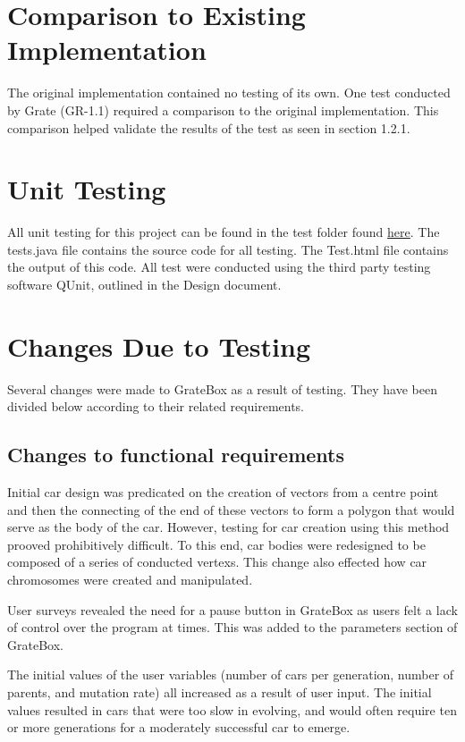 \documentclass[12pt, titlepage]{article}
\begin{document}
\section{Comparison to Existing Implementation}

The original implementation contained no testing of its own. One test conducted by Grate (GR-1.1) required a comparison to the original implementation. This comparison helped validate the results of the test as seen in section 1.2.1.

\section{Unit Testing}

All unit testing for this project can be found in the test folder found \href{https://gitlab.cas.mcmaster.ca/linkk4/GrateBox/tree/master/src/test}{here}. The tests.java file contains the source code for all testing. The Test.html file contains the output of this code. All test were conducted using the third party testing software QUnit, outlined in the Design document.

\section{Changes Due to Testing}

Several changes were made to GrateBox as a result of testing. They have been divided below according to their related requirements.

\subsection{Changes to functional requirements}

Initial car design was predicated on the creation of vectors from a centre point and then the connecting of the end of these vectors to form a polygon that would serve as the body of the car. However, testing for car creation using this method prooved prohibitively difficult. To this end, car bodies were redesigned to be composed of a series of conducted vertexs. This change also effected how car chromosomes were created and manipulated.


User surveys revealed the need for a pause button in GrateBox as users felt a lack of control over the program at times. This was added to the parameters section of GrateBox.


The initial values of the user variables (number of cars per generation, number of parents, and mutation rate) all increased as a result of user input. The initial values resulted in cars that were too slow in evolving, and would often require ten or more generations for a moderately successful car to emerge. 
\end{document}
